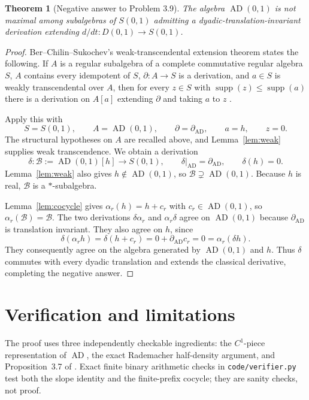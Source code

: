 \documentclass[11pt]{article}
\newtheorem{theorem}{Theorem}
\newcommand{\AD}{\operatorname{AD}}
\newcommand{\supp}{\operatorname{supp}}
\newcommand{\1}{\mathbf 1}
\begin{document}
\begin{theorem}[Negative answer to Problem 3.9]\label{thm:main}
The algebra $\AD(0,1)$ is not maximal among subalgebras of $S(0,1)$ admitting
a dyadic-translation-invariant derivation extending
$d/dt:D(0,1)\to S(0,1)$.
\end{theorem}

\begin{proof}
Ber--Chilin--Sukochev's weak-transcendental extension theorem states the
following.  If $A$ is a regular subalgebra of a complete commutative regular
algebra $S$, $A$ contains every idempotent of $S$, $\partial:A\to S$ is a
derivation, and $a\in S$ is weakly transcendental over $A$, then for every
$z\in S$ with $\supp(z)\leq\supp(a)$ there is a derivation on $A[a]$
extending $\partial$ and taking $a$ to $z$
\cite[Proposition~3.7]{BCS}.

Apply this with
\[
 S=S(0,1),\qquad A=\AD(0,1),\qquad
 \partial=\partial_{\!\AD},\qquad a=h,\qquad z=0.
\]
The structural hypotheses on $A$ are recalled above, and
Lemma~\ref{lem:weak} supplies weak transcendence.  We obtain a derivation
\[
 \delta:\mathcal B:=\AD(0,1)[h]\longrightarrow S(0,1),
 \qquad \delta|_{\AD}=\partial_{\!\AD},\qquad \delta(h)=0.
\]
Lemma~\ref{lem:weak} also gives $h\notin\AD(0,1)$, so
$\mathcal B\supsetneq\AD(0,1)$.  Because $h$ is real, $\mathcal B$ is a
$*$-subalgebra.

Lemma~\ref{lem:cocycle} gives $\alpha_r(h)=h+c_r$ with
$c_r\in\AD(0,1)$, so $\alpha_r(\mathcal B)=\mathcal B$.  The two derivations
$\delta\alpha_r$ and $\alpha_r\delta$ agree on $\AD(0,1)$ because
$\partial_{\!\AD}$ is translation invariant.  They also agree on $h$, since
\[
 \delta(\alpha_rh)=\delta(h+c_r)=0+\partial_{\!\AD}c_r=0
 =\alpha_r(\delta h).
\]
They consequently agree on the algebra generated by $\AD(0,1)$ and $h$.
Thus $\delta$ commutes with every dyadic translation and extends the
classical derivative, completing the negative answer.
\end{proof}

\section{Verification and limitations}

The proof uses three independently checkable ingredients: the
$C^1$-piece representation of $\AD$, the exact Rademacher half-density
argument, and Proposition~3.7 of \cite{BCS}.  Exact finite binary arithmetic
checks in \texttt{code/verifier.py} test both the slope identity and the
finite-prefix cocycle; they are sanity checks, not proof.
\end{document}
